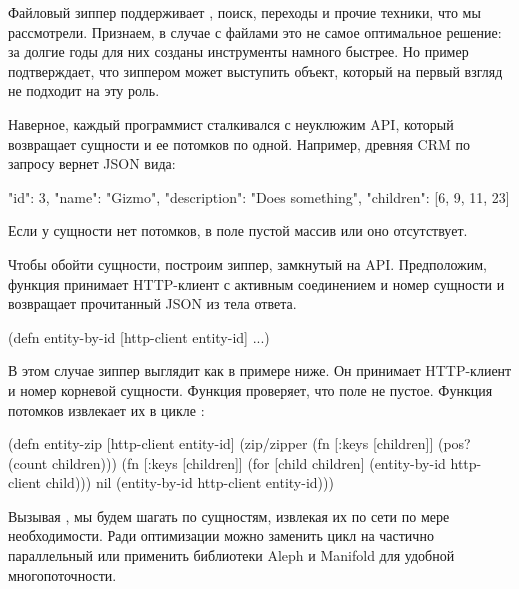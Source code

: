 Файловый зиппер поддерживает , поиск, переходы и прочие техники, что
мы рассмотрели. Признаем, в случае с файлами это не самое оптимальное решение:
за долгие годы для них созданы инструменты намного быстрее. Но пример
подтверждает, что зиппером может выступить объект, который на первый взгляд не
подходит на эту роль.

Наверное, каждый программист сталкивался с неуклюжим API, который возвращает
сущности и ее потомков по одной. Например, древняя CRM по запросу  вернет JSON вида:

\begin{english}
  \begin{json}
{
  "id": 3,
  "name": "Gizmo",
  "description": "Does something",
  "children": [6, 9, 11, 23]
}
  \end{json}
\end{english}

Если у сущности нет потомков, в поле  пустой массив или оно
отсутствует.

Чтобы обойти сущности, построим зиппер, замкнутый на API. Предположим, функция
 принимает HTTP-клиент с активным соединением и номер сущности и
возвращает прочитанный JSON из тела ответа.

\begin{english}
  \begin{clojure}
(defn entity-by-id [http-client entity-id]
  ...)
  \end{clojure}
\end{english}

В этом случае зиппер выглядит как в примере ниже. Он принимает HTTP-клиент и
номер корневой сущности. Функция  проверяет, что поле  не
пустое. Функция потомков извлекает их в цикле :

\begin{english}
  \begin{clojure}
(defn entity-zip [http-client entity-id]
  (zip/zipper (fn [{:keys [children]}]
                (pos? (count children)))
              (fn [{:keys [children]}]
                (for [child children]
                  (entity-by-id http-client child)))
              nil
              (entity-by-id http-client entity-id)))
  \end{clojure}
\end{english}

Вызывая , мы будем шагать по сущностям, извлекая их по сети по мере
необходимости. Ради оптимизации можно заменить цикл  на частично
параллельный  или применить библиотеки Aleph и Manifold для удобной
многопоточности.

